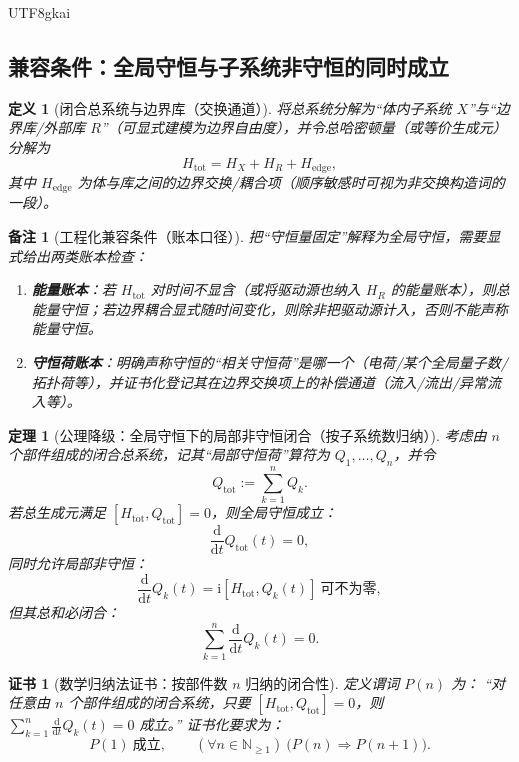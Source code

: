\documentclass[12pt]{article}
\newtheorem{definition}{定义}[section]
\newtheorem{theorem}{定理}[section]
\newtheorem{remark}{备注}[section]
\newtheorem{Certificate}{证书}[section]
\newcommand{\NN}{\mathbb{N}}
\begin{document}
\begin{CJK*}{UTF8}{gkai}
\subsection{兼容条件：全局守恒与子系统非守恒的同时成立}
\label{sec:compatibility-global-vs-local}

\begin{definition}[闭合总系统与边界库（交换通道）]
\label{def:closed-total-system-reservoir}
将总系统分解为“体内子系统 $X$”与“边界库/外部库 $R$”（可显式建模为边界自由度），并令总哈密顿量（或等价生成元）分解为
\[
  H_{\mathrm{tot}} = H_X + H_R + H_{\mathrm{edge}},
\]
其中 $H_{\mathrm{edge}}$ 为体与库之间的边界交换/耦合项（顺序敏感时可视为非交换构造词的一段）。
\end{definition}

\begin{remark}[工程化兼容条件（账本口径）]
把“守恒量固定”解释为全局守恒，需要显式给出两类账本检查：
\begin{enumerate}
  \item \textbf{能量账本}：若 $H_{\mathrm{tot}}$ 对时间不显含（或将驱动源也纳入 $H_R$ 的能量账本），则总能量守恒；若边界耦合显式随时间变化，则除非把驱动源计入，否则不能声称能量守恒。
  \item \textbf{守恒荷账本}：明确声称守恒的“相关守恒荷”是哪一个（电荷/某个全局量子数/拓扑荷等），并证书化登记其在边界交换项上的补偿通道（流入/流出/异常流入等）。
\end{enumerate}
\end{remark}

\begin{theorem}[公理降级：全局守恒下的局部非守恒闭合（按子系统数归纳）]
\label{thm:global-conservation-compat-local-nonconservation}
考虑由 $n$ 个部件组成的闭合总系统，记其“局部守恒荷”算符为 $Q_1,\dots,Q_n$，并令
\[
  Q_{\mathrm{tot}}:=\sum_{k=1}^{n} Q_k.
\]
若总生成元满足 $[H_{\mathrm{tot}},Q_{\mathrm{tot}}]=0$，则全局守恒成立：
\[
  \frac{\mathrm{d}}{\mathrm{d}t}Q_{\mathrm{tot}}(t)=0,
\]
同时允许局部非守恒：
\[
  \frac{\mathrm{d}}{\mathrm{d}t}Q_k(t)=\mathrm{i}[H_{\mathrm{tot}},Q_k(t)]\ \text{可不为零},
\]
但其总和必闭合：
\[
  \sum_{k=1}^{n}\frac{\mathrm{d}}{\mathrm{d}t}Q_k(t)=0.
\]
\end{theorem}

\begin{Certificate}[数学归纳法证书：按部件数 $n$ 归纳的闭合性]
\label{cert:global-conservation-compat-local-nonconservation}
定义谓词 $P(n)$ 为：
“对任意由 $n$ 个部件组成的闭合系统，只要 $[H_{\mathrm{tot}},Q_{\mathrm{tot}}]=0$，则 $\sum_{k=1}^{n}\frac{\mathrm{d}}{\mathrm{d}t}Q_k(t)=0$
  成立。”
证书化要求为：
\[
  P(1)\ \text{成立},\qquad
  (\forall n\in\NN_{\ge 1})\ \bigl(P(n)\Rightarrow P(n+1)\bigr).
\]
\end{Certificate}


\end{CJK*}
\end{document}
